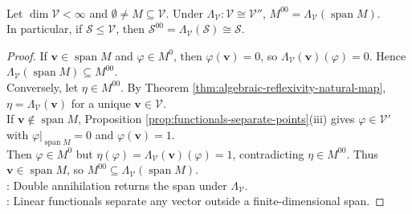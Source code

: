 \begin{theorem} \label{thm:double-annihilator-finite-dimensional} \\
Let $\dim\mathcal{V}<\infty$ and $\emptyset\neq M\subseteq\mathcal{V}$. Under $\Lambda_{\mathcal{V}}:\mathcal{V}\cong\mathcal{V}''$, $M^{00}=\Lambda_{\mathcal{V}}(\operatorname{span}M)$.\\
In particular, if $\mathcal{S}\leq\mathcal{V}$, then $\mathcal{S}^{00}=\Lambda_{\mathcal{V}}(\mathcal{S})\cong\mathcal{S}$.
\begin{proof}
If $\mathbf{v}\in\operatorname{span}M$ and $\varphi\in M^0$, then $\varphi(\mathbf{v})=0$, so $\Lambda_{\mathcal{V}}(\mathbf{v})(\varphi)=0$. Hence $\Lambda_{\mathcal{V}}(\operatorname{span}M)\subseteq M^{00}$.\\
Conversely, let $\eta\in M^{00}$. By Theorem \ref{thm:algebraic-reflexivity-natural-map}, $\eta=\Lambda_{\mathcal{V}}(\mathbf{v})$ for a unique $\mathbf{v}\in\mathcal{V}$.\\
If $\mathbf{v}\notin\operatorname{span}M$, Proposition \ref{prop:functionals-separate-points}(iii) gives $\varphi\in\mathcal{V}'$ with $\varphi|_{\operatorname{span}M}=0$ and $\varphi(\mathbf{v})=1$.\\
Then $\varphi\in M^0$ but $\eta(\varphi)=\Lambda_{\mathcal{V}}(\mathbf{v})(\varphi)=1$, contradicting $\eta\in M^{00}$. Thus $\mathbf{v}\in\operatorname{span}M$, so $M^{00}\subseteq\Lambda_{\mathcal{V}}(\operatorname{span}M)$.\\
: Double annihilation returns the span under $\Lambda_{\mathcal{V}}$.\\
: Linear functionals separate any vector outside a finite-dimensional span.
\end{proof}
\end{theorem}

